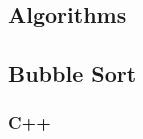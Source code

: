\documentclass{subfile}
\begin{document}
\begin{appendices}
  \section{Algorithms}
  \label{app:algorithms}
  \subsection{Bubble Sort}
  \label{app:algorithms:bubble_sort}
  \subsubsection{C++}
  \label{app:algorithms:bubble_sort:c++}
  
  
  
\end{appendices}
\end{document}
